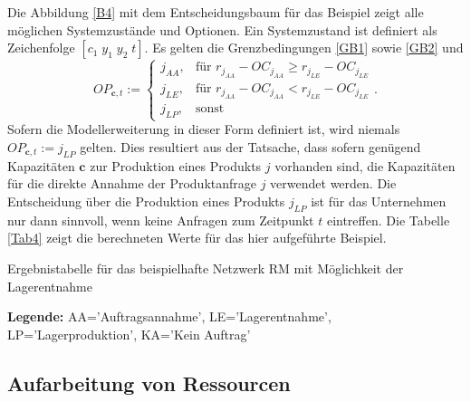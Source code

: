 Die Abbildung \ref{B4} mit dem Entscheidungsbaum für das Beispiel zeigt alle möglichen Systemzustände und Optionen. Ein Systemzustand ist definiert als Zeichenfolge $[c_{1}\; y_{1}\; y_{2}\;t]$. Es gelten die Grenzbedingungen \eqref{GB1} sowie \eqref{GB2} und
\begin{equation}\label{GB4}
     OP_{\textbf{c}, t}:=\left\{\begin{array}{lll} j_{AA}, & \text{für } r_{j_{AA}} - OC_{j_{AA}} \ge r_{j_{LE}} - OC_{j_{LE}}\\
         j_{LE}, & \text{für } r_{j_{AA}} - OC_{j_{AA}} < r_{j_{LE}} - OC_{j_{LE}}\\
         j_{LP}, & \text{sonst}\end{array}\right. .
\end{equation}
Sofern die Modellerweiterung in dieser Form definiert ist, wird niemals $OP_{\textbf{c}, t}:=j_{LP}$ gelten. Dies resultiert aus der Tatsache, dass sofern genügend Kapazitäten $\textbf{c}$ zur Produktion eines Produkts $j$ vorhanden sind, die Kapazitäten für die direkte Annahme der Produktanfrage $j$ verwendet werden. Die Entscheidung über die Produktion eines Produkts $j_{LP}$ ist für das Unternehmen nur dann sinnvoll, wenn keine Anfragen zum Zeitpunkt $t$ eintreffen. Die Tabelle \ref{Tab4} zeigt die berechneten Werte für das hier aufgeführte Beispiel.
\begin{table}
\begin{footnotesize}
    \caption{Ergebnistabelle für das beispielhafte Netzwerk RM mit Möglichkeit der Lagerentnahme} \label{Tab4}
    \vspace*{3mm}
\begin{center}
      {\footnotesize \textbf{Legende:} AA='Auftragsannahme', LE='Lagerentnahme', LP='Lagerproduktion', KA='Kein Auftrag'} 
      \end{center}
\end{footnotesize}
\end{table}

\subsection{Aufarbeitung von Ressourcen}

